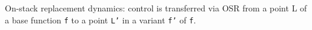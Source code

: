 \label{fig:osr-dynamics} On-stack replacement dynamics: control is transferred via OSR from a point \textsf{L} of a base function \texttt{f} to a point \texttt{L'} in a variant \texttt{f'} of \texttt{f}.
  
  
  
  
  
  
  